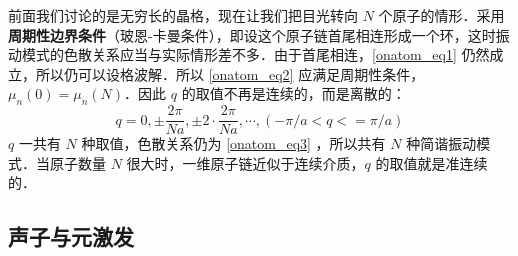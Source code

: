 前面我们讨论的是无穷长的晶格，现在让我们把目光转向 $N$ 个原子的情形．采用\textbf{周期性边界条件}（玻恩-卡曼条件），即设这个原子链首尾相连形成一个环，这时振动模式的色散关系应当与实际情形差不多．由于首尾相连，\autoref{onatom_eq1} 仍然成立，所以仍可以设格波解．所以 \autoref{onatom_eq2} 应满足周期性条件，$\mu_n(0)=\mu_n(N)$．因此 $q$ 的取值不再是连续的，而是离散的：
\begin{equation}
q=0,\pm \frac{2\pi}{Na},\pm 2\cdot \frac{2\pi}{Na},\cdots, (-\pi/a<q<=\pi/a)
\end{equation}
$q$ 一共有 $N$ 种取值，色散关系仍为 \autoref{onatom_eq3} ，所以共有 $N$ 种简谐振动模式．当原子数量 $N$ 很大时，一维原子链近似于连续介质，$q$ 的取值就是准连续的．
\subsection{声子与元激发}